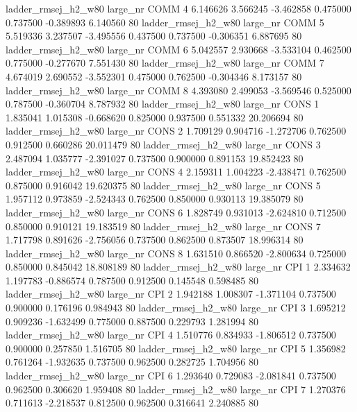 ladder_rmsej_h2_w80   large_nr     COMM                 4  6.146626  3.566245  -3.462858 0.475000 0.737500 -0.389893    6.140560 80
ladder_rmsej_h2_w80   large_nr     COMM                 5  5.519336  3.237507  -3.495556 0.437500 0.737500 -0.306351    6.887695 80
ladder_rmsej_h2_w80   large_nr     COMM                 6  5.042557  2.930668  -3.533104 0.462500 0.775000 -0.277670    7.551430 80
ladder_rmsej_h2_w80   large_nr     COMM                 7  4.674019  2.690552  -3.552301 0.475000 0.762500 -0.304346    8.173157 80
ladder_rmsej_h2_w80   large_nr     COMM                 8  4.393080  2.499053  -3.569546 0.525000 0.787500 -0.360704    8.787932 80
ladder_rmsej_h2_w80   large_nr     CONS                 1  1.835041  1.015308  -0.668620 0.825000 0.937500  0.551332   20.206694 80
ladder_rmsej_h2_w80   large_nr     CONS                 2  1.709129  0.904716  -1.272706 0.762500 0.912500  0.660286   20.011479 80
ladder_rmsej_h2_w80   large_nr     CONS                 3  2.487094  1.035777  -2.391027 0.737500 0.900000  0.891153   19.852423 80
ladder_rmsej_h2_w80   large_nr     CONS                 4  2.159311  1.004223  -2.438471 0.762500 0.875000  0.916042   19.620375 80
ladder_rmsej_h2_w80   large_nr     CONS                 5  1.957112  0.973859  -2.524343 0.762500 0.850000  0.930113   19.385079 80
ladder_rmsej_h2_w80   large_nr     CONS                 6  1.828749  0.931013  -2.624810 0.712500 0.850000  0.910121   19.183519 80
ladder_rmsej_h2_w80   large_nr     CONS                 7  1.717798  0.891626  -2.756056 0.737500 0.862500  0.873507   18.996314 80
ladder_rmsej_h2_w80   large_nr     CONS                 8  1.631510  0.866520  -2.800634 0.725000 0.850000  0.845042   18.808189 80
ladder_rmsej_h2_w80   large_nr      CPI                 1  2.334632  1.197783  -0.886574 0.787500 0.912500  0.145548    0.598485 80
ladder_rmsej_h2_w80   large_nr      CPI                 2  1.942188  1.008307  -1.371104 0.737500 0.900000  0.176196    0.984943 80
ladder_rmsej_h2_w80   large_nr      CPI                 3  1.695212  0.909236  -1.632499 0.775000 0.887500  0.229793    1.281994 80
ladder_rmsej_h2_w80   large_nr      CPI                 4  1.510776  0.834933  -1.806512 0.737500 0.900000  0.257850    1.516705 80
ladder_rmsej_h2_w80   large_nr      CPI                 5  1.356982  0.761264  -1.932635 0.737500 0.962500  0.282725    1.704956 80
ladder_rmsej_h2_w80   large_nr      CPI                 6  1.293640  0.729083  -2.081841 0.737500 0.962500  0.306620    1.959408 80
ladder_rmsej_h2_w80   large_nr      CPI                 7  1.270376  0.711613  -2.218537 0.812500 0.962500  0.316641    2.240885 80
